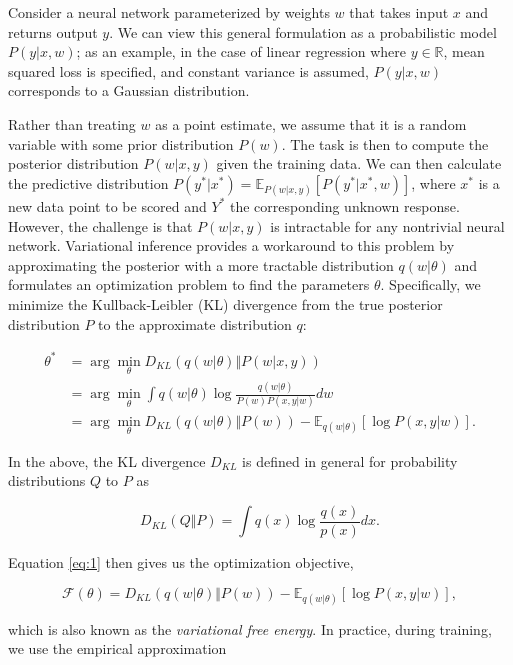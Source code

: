 \documentclass{article}
\begin{document}
Consider a neural network parameterized by weights $w$ that takes input $x$ and returns output $y$. We can view this general formulation as a probabilistic model $P(y|x, w)$; as an example, in the case of linear regression where $y \in \mathbb{R}$, mean squared loss is specified, and constant variance is assumed, $P(y|x, w)$ corresponds to a Gaussian distribution.

Rather than treating $w$ as a point estimate, we assume that it is a random variable with some prior distribution $P(w)$. The task is then to compute the posterior distribution $P(w|x, y)$ given the training data. We can then calculate the predictive distribution $P(y^*|x^*) = \mathbb{E}_{P(w|x, y)}[P(y^*|x^*, w)]$, where $x^*$ is a new data point to be scored and $Y^*$ the corresponding unknown response. However, the challenge is that $P(w|x, y)$ is intractable for any nontrivial neural network. Variational inference provides a workaround to this problem by approximating the posterior with a more tractable distribution $q(w|\theta)$ and formulates an optimization problem to find the parameters $\theta$. Specifically, we minimize the Kullback-Leibler (KL) divergence from the true posterior distribution $P$ to the approximate distribution $q$:

\begin{align}
    \theta^* &= \arg \min_\theta D_{KL}(q(w|\theta) \Vert P(w|x, y))\\
             &= \arg \min_\theta \int q(w|\theta) \log \frac{q(w|\theta)}{P(w)P(x, y|w)} dw\\
             &= \arg \min_\theta D_{KL}(q(w|\theta) \Vert P(w)) - \mathbb{E}_{q(w|\theta)}[\log P(x, y|w)]. \label{eq:1}
\end{align}

In the above, the KL divergence $D_{KL}$ is defined in general for probability distributions $Q$ to $P$ as

\begin{equation}
    D_{KL}(Q \Vert P) = \int q(x) \log \frac{q(x)}{p(x)} dx.
\end{equation}

Equation \ref{eq:1} then gives us the optimization objective,

\begin{equation}
    \mathcal{F}(\theta) = D_{KL}(q(w|\theta) \Vert P(w)) - \mathbb{E}_{q(w|\theta)}[\log P(x, y|w)],
\end{equation}

which is also known as the \textit{variational free energy}. In practice, during training, we use the empirical approximation
\end{document}
